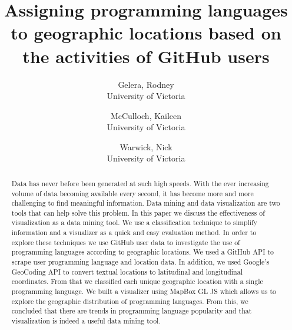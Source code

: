 \documentclass[11pt]{article}
\begin{document}
\title{Assigning programming languages to geographic locations based on the activities of GitHub users}

\author{
   Gelera, Rodney \\University of Victoria
   \and
   McCulloch, Kaileen \\University of Victoria
   \and
   Warwick, Nick \\University of Victoria
}

\maketitle

\begin{abstract}
Data has never before been generated at such high speeds. With the ever increasing volume of data becoming available every second, it has become more and more challenging to find meaningful information. Data mining and data visualization are two tools that can help solve this problem. In this paper we discuss the effectiveness of visualization as a data mining tool. We use a classification technique to simplify information and a visualizer as a quick and easy evaluation method. In order to explore these techniques we use GitHub user data to investigate the use of programming languages according to geographic locations. We used a GitHub API to scrape user programming language and location data. In addition, we used Google’s GeoCoding API to convert textual locations to latitudinal and longitudinal coordinates. From that we classified each unique geographic location with a single programming language. We built a visualizer using MapBox GL JS which allows us to explore the geographic distribution of programming languages. From this, we concluded that there are trends in programming language popularity and that visualization is indeed a useful data mining tool.
\end{abstract}

\newpage
\tableofcontents
\listoffigures
\newpage
\end{document}
